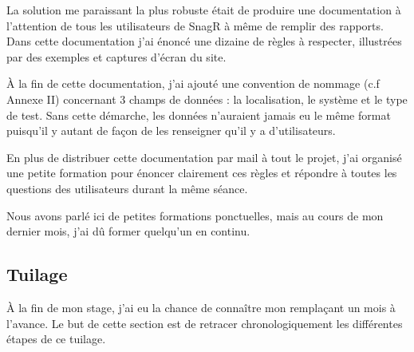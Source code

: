 La solution me paraissant la plus robuste était de produire une documentation à l'attention de tous les utilisateurs de \gls{SnagR} à même de remplir des rapports.
Dans cette documentation j'ai énoncé une dizaine de règles à respecter, illustrées par des exemples et captures d'écran du site.

À la fin de cette documentation, j'ai ajouté une convention de nommage (c.f Annexe II) concernant 3 champs de données : la localisation, le système et le type de test.
Sans cette démarche, les données n'auraient jamais eu le même format puisqu'il y autant de façon de les renseigner qu'il y a d'utilisateurs.

En plus de distribuer cette documentation par mail à tout le projet, j'ai organisé une petite formation pour énoncer clairement ces règles et répondre à toutes les questions des utilisateurs durant la même séance.

Nous avons parlé ici de petites formations ponctuelles, mais au cours de mon dernier mois, j'ai dû former quelqu'un en continu.

\subsection{Tuilage}

À la fin de mon stage, j'ai eu la chance de connaître mon remplaçant un mois à l'avance. Le but de cette section est de retracer chronologiquement les différentes étapes de ce tuilage.

